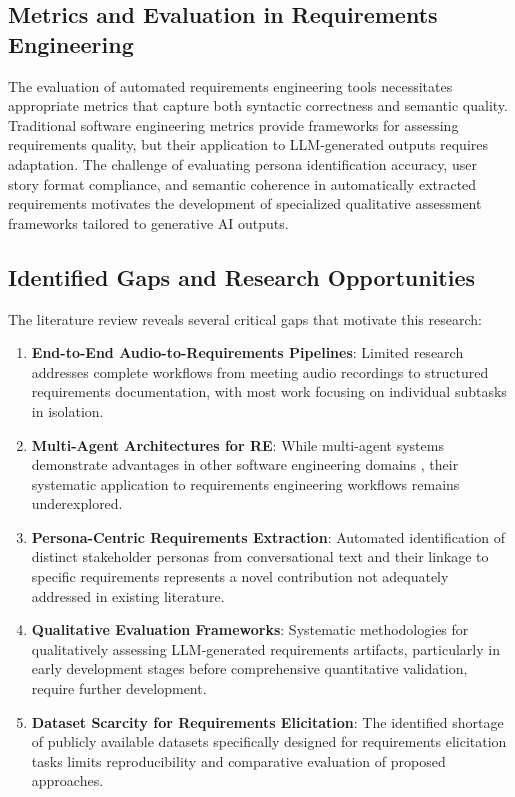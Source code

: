 \documentclass[12pt]{article}
\begin{document}
\subsection{Metrics and Evaluation in Requirements Engineering}

The evaluation of automated requirements engineering tools necessitates appropriate metrics that capture both syntactic correctness and semantic quality. Traditional software engineering metrics \cite{bokhari2011metrics} provide frameworks for assessing requirements quality, but their application to LLM-generated outputs requires adaptation. The challenge of evaluating persona identification accuracy, user story format compliance, and semantic coherence in automatically extracted requirements motivates the development of specialized qualitative assessment frameworks tailored to generative AI outputs.

\subsection{Identified Gaps and Research Opportunities}

The literature review reveals several critical gaps that motivate this research:

\begin{enumerate}
    \item \textbf{End-to-End Audio-to-Requirements Pipelines}: Limited research addresses complete workflows from meeting audio recordings to structured requirements documentation, with most work focusing on individual subtasks in isolation.
    
    \item \textbf{Multi-Agent Architectures for RE}: While multi-agent systems demonstrate advantages in other software engineering domains \cite{sami2024experimentingmultiagent}, their systematic application to requirements engineering workflows remains underexplored.
    
    \item \textbf{Persona-Centric Requirements Extraction}: Automated identification of distinct stakeholder personas from conversational text and their linkage to specific requirements represents a novel contribution not adequately addressed in existing literature.
    
    \item \textbf{Qualitative Evaluation Frameworks}: Systematic methodologies for qualitatively assessing LLM-generated requirements artifacts, particularly in early development stages before comprehensive quantitative validation, require further development.
    
    \item \textbf{Dataset Scarcity for Requirements Elicitation}: The identified shortage of publicly available datasets \cite{motger2025share} specifically designed for requirements elicitation tasks limits reproducibility and comparative evaluation of proposed approaches.
\end{enumerate}
\end{document}
